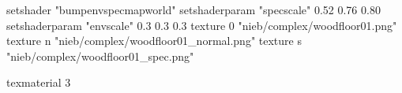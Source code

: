 setshader "bumpenvspecmapworld"
setshaderparam "specscale" 0.52 0.76 0.80
setshaderparam "envscale"  0.3 0.3 0.3
   texture 0 "nieb/complex/woodfloor01.png"
   texture n "nieb/complex/woodfloor01_normal.png"
   texture s "nieb/complex/woodfloor01_spec.png"

texmaterial 3
